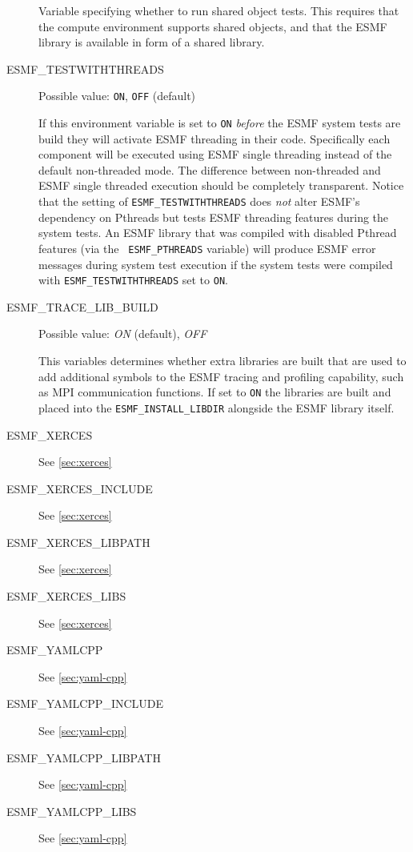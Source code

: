 \begin{description}
Variable specifying whether to run shared object tests. This requires that the compute environment supports shared objects, and that the ESMF library is available in form of a shared library.

\item[ESMF\_TESTWITHTHREADS]
Possible value: {\tt ON}, {\tt OFF} (default)

If this environment variable is set to {\tt ON} {\em before} the ESMF system
tests are build they will activate ESMF threading in their code. Specifically
each component will be executed using ESMF single threading instead of the
default non-threaded mode. The difference between non-threaded and ESMF
single threaded execution should be completely transparent. Notice that the
setting of {\tt ESMF\_TESTWITHTHREADS} does {\em not} alter ESMF's dependency
on Pthreads but tests ESMF threading features during the system tests. An
ESMF library that was compiled with disabled Pthread features (via the {\tt
ESMF\_PTHREADS} variable) will produce ESMF error messages during system test
execution if the system tests were compiled with {\tt ESMF\_TESTWITHTHREADS}
set to {\tt ON}.

\item[ESMF\_TRACE\_LIB\_BUILD]
Possible value: {\em ON} (default), {\em OFF}

This variables determines whether extra libraries are built that are used
to add additional symbols to the ESMF tracing and profiling capability,
such as MPI communication functions.
If set to {\tt ON} the libraries are built and placed into the
{\tt ESMF\_INSTALL\_LIBDIR} alongside the ESMF library itself.

\item[ESMF\_XERCES]
See \ref{sec:xerces}

\item[ESMF\_XERCES\_INCLUDE]
See \ref{sec:xerces}

\item[ESMF\_XERCES\_LIBPATH]
See \ref{sec:xerces}

\item[ESMF\_XERCES\_LIBS]
See \ref{sec:xerces}

\item[ESMF\_YAMLCPP]
See \ref{sec:yaml-cpp}

\item[ESMF\_YAMLCPP\_INCLUDE]
See \ref{sec:yaml-cpp}

\item[ESMF\_YAMLCPP\_LIBPATH]
See \ref{sec:yaml-cpp}

\item[ESMF\_YAMLCPP\_LIBS]
See \ref{sec:yaml-cpp}

\end{description}

